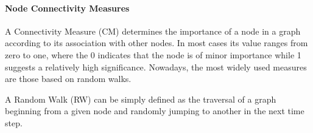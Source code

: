 \paragraph{Node Connectivity Measures}\label{sec:connectivity_measures}
A Connectivity Measure (CM) determines the importance of a node in a graph according to its association with other nodes. In most cases its value ranges from zero to one, where the 0 indicates that the node is of minor importance while 1 suggests a relatively high significance. Nowadays, the most widely used  measures are those based on random walks.

A Random Walk (RW) can be simply defined as the traversal of a graph beginning from a given node and randomly jumping to another in the next time step.

